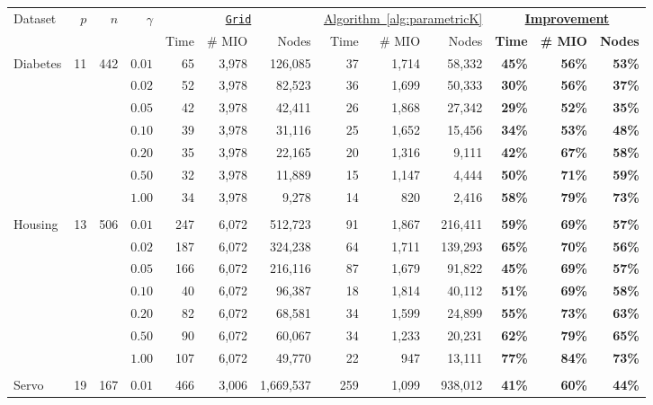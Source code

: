 \documentclass[mnsc,nonblindrev]{informs3} %
\begin{document}
\begin{center}
\begin{table}[h!]
\begin{tabular}{l r r r|r r r | r r r  | r r r }
		\hline
		\multirow{2}{*}{Dataset}&\multirow{2}{*}{$p$}&\multirow{2}{*}{$n$}&\multirow{2}{*}{$\gamma$}& \multicolumn{3}{c|}{\underline{\texttt{Grid}}}&\multicolumn{3}{c|}{\underline{Algorithm~\ref{alg:parametricK}}}&\multicolumn{3}{c}{\textbf{\underline{Improvement}}}\\
		&&&&Time&\# MIO&Nodes&Time&\# MIO&Nodes&\textbf{Time}&\textbf{\# MIO}&\textbf{Nodes}\\
		\hline
			\multirow{7}{*}{Diabetes}&\multirow{7}{*}{11}&\multirow{7}{*}{442}&
		$0.01$&65&3,978&126,085&37&1,714&58,332&\textbf{45\%}&\textbf{56\%}&\textbf{53\%}\\
		&&&$0.02$&52&3,978&82,523&36&1,699&50,333&\textbf{30\%}&\textbf{56\%}&\textbf{37\%}\\
		&&&$0.05$&42&3,978&42,411&26&1,868&27,342&\textbf{29\%}&\textbf{52\%}&\textbf{35\%}\\
		&&&$0.10$&39&3,978&31,116&25&1,652&15,456&\textbf{34\%}&\textbf{53\%}&\textbf{48\%}\\
		&&&$0.20$&35&3,978&22,165&20&1,316&9,111&\textbf{42\%}&\textbf{67\%}&\textbf{58\%}\\
		&&&$0.50$&32&3,978&11,889&15&1,147&4,444&\textbf{50\%}&\textbf{71\%}&\textbf{59\%}\\
		&&&$1.00$&34&3,978&9,278&14&820&2,416&\textbf{58\%}&\textbf{79\%}&\textbf{73\%}\\
		&&&&&&&&&&&&\\
		\multirow{7}{*}{Housing}&\multirow{7}{*}{13}&\multirow{7}{*}{506}&
		$0.01$&247&6,072&512,723&91&1,867&216,411&\textbf{59\%}&\textbf{69\%}&\textbf{57\%}\\
		&&&$0.02$&187&6,072&324,238&64&1,711&139,293&\textbf{65\%}&\textbf{70\%}&\textbf{56\%}\\
		&&&$0.05$&166&6,072&216,116&87&1,679&91,822&\textbf{45\%}&\textbf{69\%}&\textbf{57\%}\\
		&&&$0.10$&40&6,072&96,387&18&1,814&40,112&\textbf{51\%}&\textbf{69\%}&\textbf{58\%}\\
		&&&$0.20$&82&6,072&68,581&34&1,599&24,899&\textbf{55\%}&\textbf{73\%}&\textbf{63\%}\\
		&&&$0.50$&90&6,072&60,067&34&1,233&20,231&\textbf{62\%}&\textbf{79\%}&\textbf{65\%}\\
		&&&$1.00$&107&6,072&49,770&22&947&13,111&\textbf{77\%}&\textbf{84\%}&\textbf{73\%}\\
		&&&&&&&&&&&&\\
		\multirow{7}{*}{Servo}&\multirow{7}{*}{19}&\multirow{7}{*}{167}&
		$0.01$&466&3,006&1,669,537&259&1,099&938,012&\textbf{41\%}&\textbf{60\%}&\textbf{44\%}\\

\end{tabular}
\end{table}
\end{center}
\end{document}
